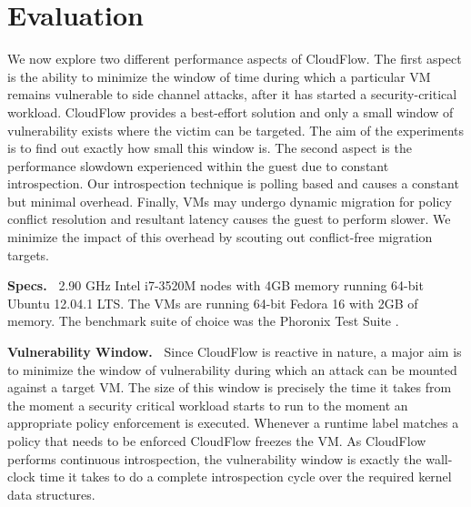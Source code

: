 \vspace{5pt}

\section{Evaluation}
\label{sec:evaluation}

We now explore two different performance aspects of CloudFlow. 
The first aspect is the ability to minimize the window of time during which
a particular VM remains vulnerable to side channel attacks, after it has
started a security-critical workload.  CloudFlow provides a best-effort
solution and only a small window of vulnerability exists where the victim
can be targeted.  The aim of the experiments is to find out exactly how
small this window is.  The second aspect is the performance slowdown
experienced within the guest due to constant introspection.  Our
introspection technique is polling based and causes a constant but minimal
overhead.  Finally, VMs may undergo dynamic migration for policy conflict
resolution and resultant latency causes the guest to perform
slower.  We minimize the impact of this overhead by scouting out conflict-free migration targets.

\noindent
{\bf Specs.~} 
% 
2.90 GHz Intel i7-3520M nodes with 4GB memory running 64-bit Ubuntu 12.04.1
LTS.  The VMs are running 64-bit Fedora 16 with 2GB of memory. The benchmark
suite of choice was the Phoronix Test Suite \cite{Phoronix}.

\noindent
{\bf Vulnerability Window.~}
%
Since CloudFlow is reactive in nature, a major aim is to minimize the window of
vulnerability during which an attack can be mounted against a target VM. 
The size of this window is precisely the time it takes from the moment a
security critical workload starts to run to the moment an appropriate policy
enforcement is executed.  Whenever a runtime label matches a policy
that needs to be enforced CloudFlow freezes the VM. As CloudFlow performs continuous introspection, the vulnerability window
is exactly the wall-clock time it takes to do a complete introspection cycle over the
required kernel data structures.

